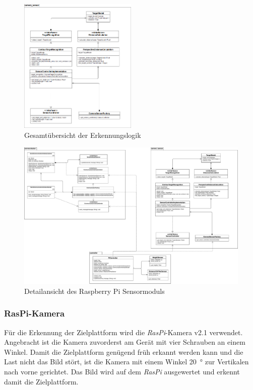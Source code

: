 \documentclass[a4paper]{report}
\begin{document}
\begin{figure}[h!]
	\centering
	\includegraphics[keepaspectratio,width=0.5\textwidth]{pi-sensor_cs}
	\caption{Gesamtübersicht der Erkennungslogik}
	\label{fig:KameraSensor}
\end{figure}

\begin{landscape}
	
	\begin{figure}[h!]
		\centering
		\includegraphics[keepaspectratio,width=\linewidth]{pi-sensor}
		\caption{Detailansicht des Raspberry Pi Sensormoduls}
		\label{fig:PiSensor}
	\end{figure}
	
\end{landscape}

\subsubsection{RasPi-Kamera}
Für die Erkennung der Zielplattform wird die \textit{RasPi}-Kamera v2.1 verwendet. Angebracht ist die Kamera zuvorderst am Gerät mit vier Schrauben an einem Winkel. Damit die Zielplattform genügend früh erkannt werden kann und die Last nicht das Bild stört, ist die Kamera mit einem Winkel \SI{20}{\degree} zur Vertikalen nach vorne gerichtet. Das Bild wird auf dem \textit{RasPi} ausgewertet und erkennt damit die Zielplattform.
\end{document}

